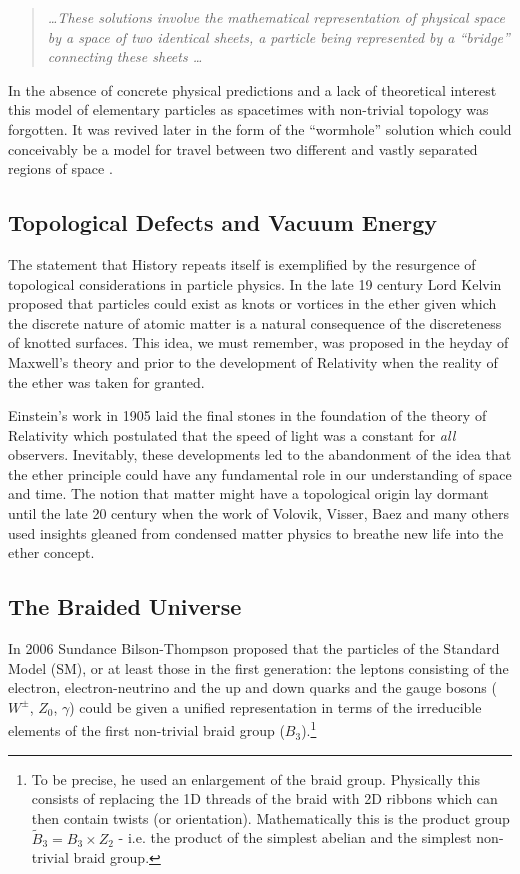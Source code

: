 \begin{doublespace}
\begin{quote}
\emph{\dots These solutions involve the mathematical representation of physical space by a space of two identical sheets, a particle being represented by a ``bridge'' connecting these sheets \dots}
\end{quote}

In the absence of concrete physical predictions and a lack of theoretical interest this model of elementary particles as spacetimes with non-trivial topology was forgotten. It was revived later in the form of the ``wormhole'' solution which could conceivably be a model for travel between two different and vastly separated regions of space \cite{Morris1988Wormholes,Visser1996Lorentzian}.

\subsection{Topological Defects and Vacuum Energy}

The statement that History repeats itself is exemplified by the resurgence of topological considerations in particle physics. In the late 19 century Lord Kelvin proposed that particles could exist as knots or vortices in the ether given which the discrete nature of atomic matter is a natural consequence of the discreteness of knotted surfaces. This idea, we must remember, was proposed in the heyday of Maxwell's theory and prior to the development of Relativity when the reality of the ether was taken for granted.

Einstein's work in 1905 laid the final stones in the foundation of the theory of Relativity which postulated that the speed of light was a constant for \emph{all} observers. Inevitably, these developments led to the abandonment of the idea that the ether principle could have any fundamental role in our understanding of space and time. The notion that matter might have a topological origin lay dormant until the late 20 century when the work of Volovik, Visser, Baez and many others used insights gleaned from condensed matter physics to breathe new life into the ether concept.

\subsection{The Braided Universe}

In 2006 Sundance Bilson-Thompson proposed that the particles of the Standard Model (SM), or at least those in the first generation: the leptons consisting of the electron, electron-neutrino and the up and down quarks and the gauge bosons ($W^\pm$, $Z_0$, $\gamma$) could be given a unified representation in terms of the irreducible elements of the first non-trivial braid group ($B_3$).\footnote{To be precise, he used an enlargement of the braid group.  Physically this consists of replacing the 1D threads of the braid with 2D ribbons which can then contain twists (or orientation). Mathematically this is the product group $\tilde{B}_3 = B_3 \times Z_2$ - i.e. the product of the simplest abelian and the simplest non-trivial braid group.}


\end{doublespace}
